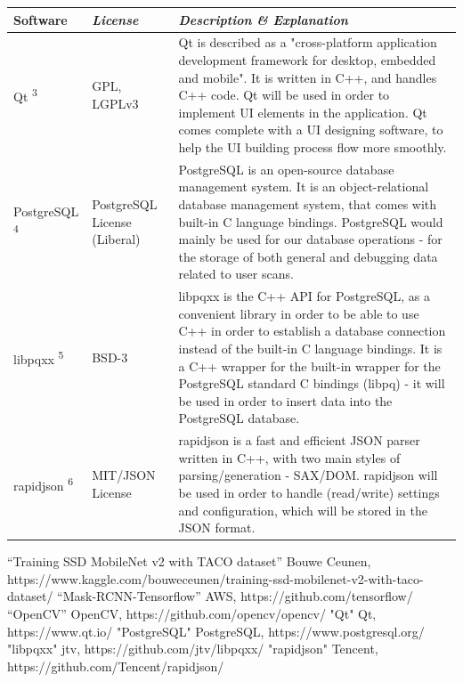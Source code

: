 \documentclass[conference]{IEEEtran}
\begin{document}
\begin{table}[htbp!]\normalsize
\begin{center}
\begin{tabular}{|p{1.5cm}|p{1.5cm}|p{4.7cm}|}
\hline
\textbf{Software} & \textbf{\textit{License}}& \textbf{\textit{Description \& Explanation}}\\
\hline
Qt \textsuperscript{3} & GPL, LGPLv3 &
Qt is described as a "cross-platform application development framework for desktop, embedded and mobile". It is written in C++, and handles C++ code. \newline\newline
Qt will be used in order to implement UI elements in the application. Qt comes complete with a UI designing software, to help the UI building process flow more smoothly.
\\ \hline
PostgreSQL \textsuperscript{4} & PostgreSQL License (Liberal) &
PostgreSQL is an open-source database management system. It is an object-relational database management system, that comes with built-in C language bindings.\newline\newline
PostgreSQL would mainly be used for our database operations - for the storage of both general and debugging data related to user scans.
\\ \hline
libpqxx \textsuperscript{5} & BSD-3 &
libpqxx is the C++ API for PostgreSQL, as a convenient library in order to be able to use C++ in order to establish a database connection instead of the built-in C language bindings.\newline\newline
It is a C++ wrapper for the built-in wrapper for the PostgreSQL standard C bindings (libpq) - it will be used in order to insert data into the PostgreSQL database.
\\ \hline
rapidjson \textsuperscript{6} & MIT/JSON License &
rapidjson is a fast and efficient JSON parser written in C++, with two main styles of parsing/generation - SAX/DOM.\newline\newline
rapidjson will be used in order to handle (read/write) settings and configuration, which will be stored in the JSON format.
\\ \hline
\end{tabular}
\label{tab1}
\end{center}
\end{table}

\begin{thebibliography}{00}
 “Training SSD MobileNet v2 with TACO dataset” Bouwe Ceunen, https://www.kaggle.com/bouweceunen/training-ssd-mobilenet-v2-with-taco-dataset/
 “Mask-RCNN-Tensorflow” AWS, https://github.com/tensorflow/
 “OpenCV” OpenCV, https://github.com/opencv/opencv/
 "Qt" Qt, https://www.qt.io/
 "PostgreSQL" PostgreSQL, https://www.postgresql.org/
 "libpqxx" jtv, https://github.com/jtv/libpqxx/
 "rapidjson" Tencent, https://github.com/Tencent/rapidjson/
\end{thebibliography}~\\~\\
\end{document}
